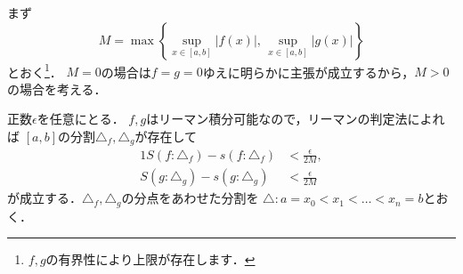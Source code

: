 \documentclass[uplatex]{jsarticle}
\makeatletter
\renewenvironment{proof}[1][\proofname]{\par
        \pushQED{\qed}
        \normalfont
        \topsep6\p@\@plus6\p@ \trivlist
        \item[\hskip\labelsep{\bfseries #1}\@addpunct{\bfseries}]\ignorespaces
    }{%
        \popQED\endtrivlist\@endpefalse
    }
\renewcommand{\proofname}{\underline{証明.}}
\makeatother
\begin{document}
\begin{proof}
    まず
    \begin{equation}
        M = \max \left\{ \sup_{x \in [a,b]} |f(x)|,\, \sup_{x \in [a,b]} |g(x)| \right\}
    \end{equation}
    とおく\footnote{$f, g$の有界性により上限が存在します．}．
    $M = 0$の場合は$f = g = 0$ゆえに明らかに主張が成立するから，$M > 0$の場合を考える．

    正数$\epsilon$を任意にとる．
    $f, g$はリーマン積分可能なので，リーマンの判定法によれば
    $[a,b]$の分割$\triangle_f, \triangle_g$が存在して
    \begin{alignat}{1}
        S(f: \triangle_f) - s(f: \triangle_f) &< \frac{\epsilon}{2M}, \\
        S(g: \triangle_g) - s(g: \triangle_g) &< \frac{\epsilon}{2M}
    \end{alignat}
    が成立する．$\triangle_f, \triangle_g$の分点をあわせた分割を
    $\triangle: a = x_0 < x_1 < \dots < x_n = b$とおく．


\end{proof}
\end{document}
